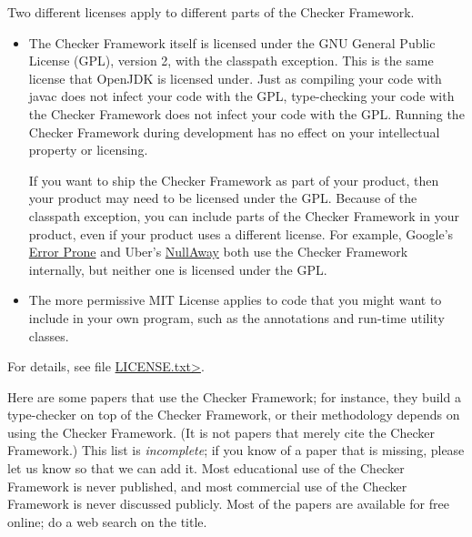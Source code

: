 Two different licenses apply to different parts of the Checker Framework.
\begin{itemize}
\item
The Checker Framework itself is licensed under the GNU General Public License
(GPL), version 2, with the classpath exception.
This is the same license that OpenJDK is licensed
under.  Just as compiling your code with javac does not infect your code
with the GPL, type-checking your code with the Checker Framework does not
infect your code with the GPL\@.  Running the Checker Framework during
development has no effect on your intellectual property or licensing.

If you want to ship the Checker Framework as part of your product, then
your product may need to be licensed under the GPL\@.  Because of the
classpath exception, you can include parts of the Checker Framework in your
product, even if your product uses a different license.  For example,
Google's \href{https://github.com/google/error-prone}{Error Prone} and
Uber's \href{https://github.com/uber/NullAway}{NullAway} both use the
Checker Framework internally, but neither one is licensed under the GPL\@.

\item
The more permissive MIT License applies
to code that you might want to include in your own
program, such as the annotations and run-time utility classes.
\end{itemize}

\noindent
For details, see file
\href{https://raw.githubusercontent.com/typetools/checker-framework/master/LICENSE.txt}{\<LICENSE.txt>}.



Here are some papers that use the Checker Framework;
for instance, they build a type-checker on top of the Checker Framework, or
their methodology depends on using the Checker Framework.
(It is not papers that merely cite the Checker Framework.)
This list is \emph{incomplete}; if you know of a paper that
is missing, please let us know so that we can add it.
Most educational use of the Checker Framework is never published, and most
commercial use of the Checker Framework is never discussed publicly.
Most of the papers are available for free online; do a web search on the
title.

